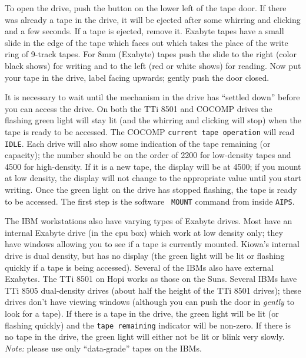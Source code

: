      To open the drive, push the button on the lower left of the tape
door.  If there was already a tape in the drive, it will be ejected
after some whirring and clicking and a few seconds.  If a tape is
ejected, remove it.  Exabyte tapes have a small slide in the edge of
the tape which faces out which takes the place of the write ring of
9-track tapes.  For 8mm (Exabyte) tapes push the slide to the right
(color black shows) for writing and to the left (red or white shows)
for reading.  Now put your tape in the drive, label facing upwards;
gently push the door closed.

     It is necessary to wait until the mechanism in the drive has
``settled down'' before you can access the drive.  On both the TTi
8501 and COCOMP drives the flashing green light will stay lit (and the
whirring and clicking will stop) when the tape is ready to be
accessed.  The COCOMP {\tt current tape operation} will read
\hbox{{\tt IDLE}}.  Each drive will also show some indication of the
tape remaining (or capacity); the number should be on the order of
2200 for low-density tapes and 4500 for high-density.  If it is a new
tape, the display will be at 4500; if you mount at low density, the
display will not change to the appropriate value until you start
writing.  Once the green light on the drive has stopped flashing, the
tape is ready to be accessed.  The first step is the software {\tt
MOUNT} command from inside \hbox{{\tt AIPS}}.

     The IBM workstations also have varying types of Exabyte drives.
Most have an internal Exabyte drive (in the cpu box) which work at
low density only; they have windows allowing you to see if a tape is
currently mounted.  Kiowa's internal drive is dual density, but has no
display (the green light will be lit or flashing quickly if a tape is
being accessed).  Several of the IBMs also have external Exabytes.
The TTi 8501 on Hopi works as those on the Suns.  Several IBMs have
TTi 8505 dual-density drives (about half the height of the TTi 8501
drives); these drives don't have viewing windows (although you can
push the door in {\it gently} to look for a tape).  If there is a tape
in the drive, the green light will be lit (or flashing quickly) and
the {\tt tape remaining} indicator will be non-zero.  If there is no
tape in the drive, the green light will either not be lit or blink
very slowly.  {\it Note:\/} please use only ``data-grade'' tapes on
the IBMs.


